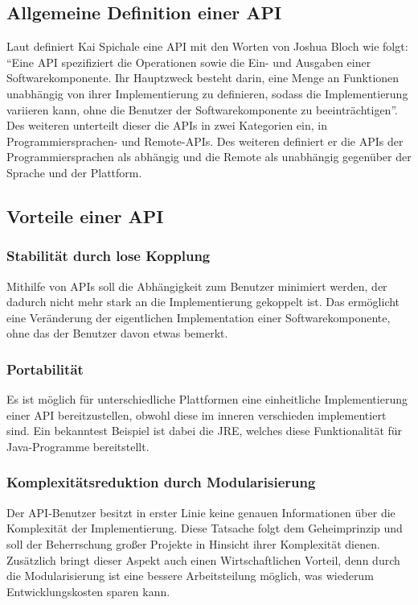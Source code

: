 \subsection{Allgemeine Definition einer \gls{API}}\label{sec:defAPI}
Laut \cite[7]{apiDesign} definiert Kai Spichale eine \gls{API} mit den Worten von Joshua Bloch wie folgt: \enquote{Eine API spezifiziert die Operationen sowie die Ein- und Ausgaben einer Softwarekomponente. Ihr Hauptzweck besteht darin, eine Menge an Funktionen unabhängig von ihrer Implementierung zu definieren, sodass die Implementierung variieren kann, ohne die Benutzer der Softwarekomponente zu beeinträchtigen}. Des weiteren unterteilt dieser die \glspl{API} in zwei Kategorien ein, in Programmiersprachen- und Remote-\glspl{API}. Des weiteren definiert er die \glspl{API} der Programmiersprachen als abhängig und die Remote als unabhängig gegenüber der Sprache und der Plattform.

\subsection{Vorteile einer \gls{API}}
\subsubsection{Stabilität durch lose Kopplung}
Mithilfe von \glspl{API} soll die Abhängigkeit zum Benutzer minimiert werden, der dadurch nicht mehr stark an die Implementierung gekoppelt ist. Das ermöglicht eine Veränderung der eigentlichen Implementation einer Softwarekomponente, ohne das der Benutzer davon etwas bemerkt.

\subsubsection{Portabilität}
Es ist möglich für unterschiedliche Plattformen eine einheitliche Implementierung einer \gls{API} bereitzustellen, obwohl diese im inneren verschieden implementiert sind. Ein bekanntest Beispiel ist dabei die \gls{JRE}, welches diese Funktionalität für Java-Programme bereitstellt.

\subsubsection{Komplexitätsreduktion durch Modularisierung}
Der \gls{API}-Benutzer besitzt in erster Linie keine genauen Informationen über die Komplexität der Implementierung. Diese Tatsache folgt dem Geheimprinzip und soll der Beherrschung großer Projekte in Hinsicht ihrer Komplexität dienen. Zusätzlich bringt dieser Aspekt auch einen Wirtschaftlichen Vorteil, denn durch die Modularisierung ist eine bessere Arbeitsteilung möglich, was wiederum Entwicklungskosten sparen kann.

